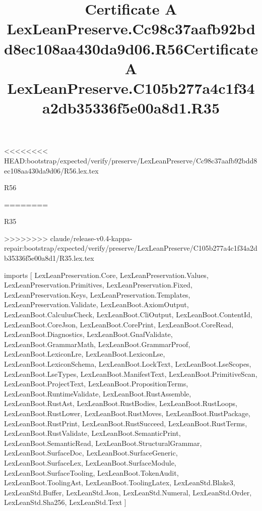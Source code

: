 <<<<<<<< HEAD:bootstrap/expected/verify/preserve/LexLeanPreserve/Cc98c37aafb92bdd8ec108aa430da9d06/R56.lex.tex
\begin{lexlean}{R56}
\title{Certificate A LexLeanPreserve.Cc98c37aafb92bdd8ec108aa430da9d06.R56}
========
\begin{lexlean}{R35}
\title{Certificate A LexLeanPreserve.C105b277a4c1f34a2db35336f5e00a8d1.R35}
>>>>>>>> claude/release-v0.4-kappa-repair:bootstrap/expected/verify/preserve/LexLeanPreserve/C105b277a4c1f34a2db35336f5e00a8d1/R35.lex.tex
\begin{coremodule}
imports [
  LexLeanPreservation.Core,
  LexLeanPreservation.Values,
  LexLeanPreservation.Primitives,
  LexLeanPreservation.Fixed,
  LexLeanPreservation.Keys,
  LexLeanPreservation.Templates,
  LexLeanPreservation.Validate,
  LexLeanBoot.AxiomOutput,
  LexLeanBoot.CalculusCheck,
  LexLeanBoot.CliOutput,
  LexLeanBoot.ContentId,
  LexLeanBoot.CoreJson,
  LexLeanBoot.CorePrint,
  LexLeanBoot.CoreRead,
  LexLeanBoot.Diagnostics,
  LexLeanBoot.GnafValidate,
  LexLeanBoot.GrammarMath,
  LexLeanBoot.GrammarProof,
  LexLeanBoot.LexiconLre,
  LexLeanBoot.LexiconLse,
  LexLeanBoot.LexiconSchema,
  LexLeanBoot.LockText,
  LexLeanBoot.LseScopes,
  LexLeanBoot.LseTypes,
  LexLeanBoot.ManifestText,
  LexLeanBoot.PrimitiveScan,
  LexLeanBoot.ProjectText,
  LexLeanBoot.PropositionTerms,
  LexLeanBoot.RuntimeValidate,
  LexLeanBoot.RustAssemble,
  LexLeanBoot.RustAst,
  LexLeanBoot.RustBodies,
  LexLeanBoot.RustLoops,
  LexLeanBoot.RustLower,
  LexLeanBoot.RustMoves,
  LexLeanBoot.RustPackage,
  LexLeanBoot.RustPrint,
  LexLeanBoot.RustSucceed,
  LexLeanBoot.RustTerms,
  LexLeanBoot.RustValidate,
  LexLeanBoot.SemanticPrint,
  LexLeanBoot.SemanticRead,
  LexLeanBoot.StructuralGrammar,
  LexLeanBoot.SurfaceDoc,
  LexLeanBoot.SurfaceGeneric,
  LexLeanBoot.SurfaceLex,
  LexLeanBoot.SurfaceModule,
  LexLeanBoot.SurfaceTooling,
  LexLeanBoot.TokenAudit,
  LexLeanBoot.ToolingAst,
  LexLeanBoot.ToolingLatex,
  LexLeanStd.Blake3,
  LexLeanStd.Buffer,
  LexLeanStd.Json,
  LexLeanStd.Numeral,
  LexLeanStd.Order,
  LexLeanStd.Sha256,
  LexLeanStd.Text
]


\end{coremodule}
\end{lexlean}
\end{lexlean}
